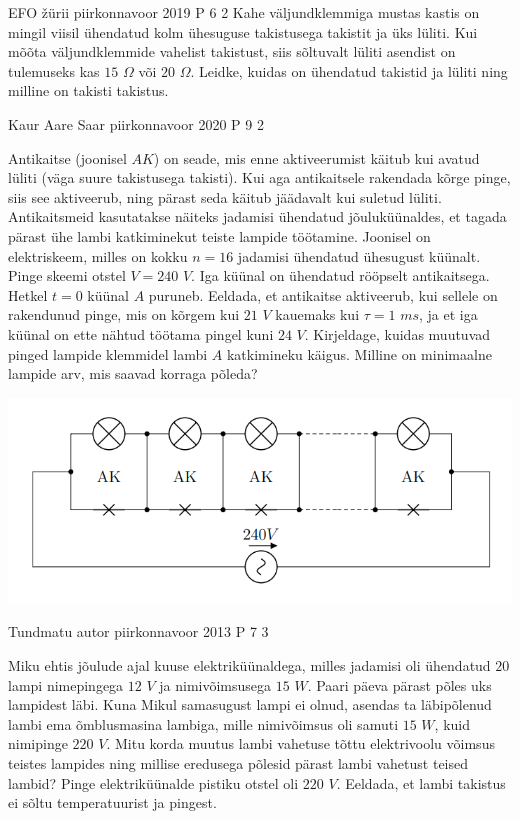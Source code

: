 \documentclass[11pt]{article}
\begin{document}
{%
{EFO žürii} %
{piirkonnavoor} %
{2019} %
{P 6} %
{2} %
{
\ifStatement
Kahe väljundklemmiga mustas kastis on mingil viisil ühendatud kolm ühesuguse takistusega takistit ja üks lüliti. Kui mõõta väljundklemmide vahelist takistust, siis sõltuvalt lüliti asendist on tulemuseks kas $15$ $\Omega$ või $20$ $\Omega$. Leidke, kuidas on ühendatud takistid ja lüliti ning milline on takisti takistus.
\fi
}

{Kaur Aare Saar} %
{piirkonnavoor} %
{2020} %
{P 9} %
{2} %
{
\ifStatement
Antikaitse (joonisel $AK$) on seade, mis enne aktiveerumist käitub kui avatud lüliti (väga suure takistusega takisti). Kui aga antikaitsele rakendada kõrge pinge, siis see aktiveerub, ning pärast seda käitub jäädavalt kui suletud lüliti. Antikaitsmeid kasutatakse näiteks jadamisi ühendatud jõuluküünaldes, et tagada pärast ühe lambi katkiminekut teiste lampide töötamine. Joonisel on elektriskeem, milles on kokku $n = 16$ jadamisi ühendatud ühesugust küünalt. Pinge skeemi otstel $V = 240$ $V$. Iga küünal on ühendatud rööpselt antikaitsega. Hetkel $t = 0$ küünal $A$ puruneb. Eeldada, et antikaitse aktiveerub, kui sellele on rakendunud pinge, mis on kõrgem kui $21$ $V$ kauemaks kui $\tau = 1$ $ms$, ja et iga küünal on ette nähtud töötama pingel kuni $24$ $V$. Kirjeldage, kuidas muutuvad pinged lampide klemmidel lambi $A$ katkimineku käigus.  Milline on minimaalne lampide arv, mis saavad korraga põleda?
\begin{center}
	\includegraphics[width=0.5\linewidth]{2020-v2p-09-yl.png}
\end{center}
\fi
}

{Tundmatu autor} %
{piirkonnavoor} %
{2013} %
{P 7} %
{3} %
{
\ifStatement
Miku ehtis jõulude ajal kuuse elektriküünaldega, milles jadamisi oli ühendatud $20$ lampi nimepingega $12$ $V$ ja nimivõimsusega $15$ $W$. Paari päeva pärast põles uks lampidest läbi. Kuna Mikul samasugust lampi ei olnud, asendas ta läbipõlenud lambi ema õmblusmasina lambiga, mille nimivõimsus oli samuti $15$ $W$, kuid nimipinge $220$ $V$. Mitu korda muutus lambi vahetuse tõttu elektrivoolu võimsus teistes lampides ning millise eredusega põlesid pärast lambi vahetust teised lambid? Pinge elektriküünalde pistiku otstel oli $220$ $V$. Eeldada, et lambi takistus ei sõltu temperatuurist ja pingest.

}}
\end{document}
